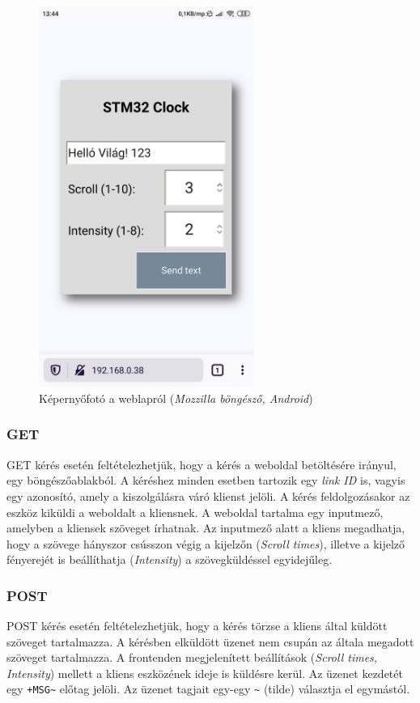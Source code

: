 \documentclass[a4paper, 12pt]{article}
\begin{document}
\begin{figure}[ht]
	\centering
	\includegraphics[width = 7cm]{images/webpage.png}
	\caption{Képernyőfotó a weblapról (\textit{Mozzilla böngésző, Android})}
	\label{fig:webpage}
\end{figure}	

\subsubsection{GET}

GET kérés esetén feltételezhetjük, hogy a kérés a weboldal betöltésére irányul, egy böngészőablakból. A kéréshez minden esetben tartozik egy \textit{link ID} is, vagyis egy azonosító, amely a kiszolgálásra váró klienst jelöli. A kérés feldolgozásakor az eszköz kiküldi a weboldalt a kliensnek. A weboldal tartalma egy inputmező, amelyben a kliensek szöveget írhatnak. Az inputmező alatt a kliens megadhatja, hogy a szövege hányszor csússzon végig a kijelzőn (\textit{Scroll times}), illetve a kijelző fényerejét is beállíthatja (\textit{Intensity}) a szövegküldéssel egyidejűleg.

\subsubsection{POST}

POST kérés esetén feltételezhetjük, hogy a kérés törzse a kliens által küldött szöveget tartalmazza.
A kérésben elküldött üzenet nem csupán az általa megadott szöveget tartalmazza. A frontenden megjelenített beállítások (\textit{Scroll times, Intensity}) mellett a kliens eszközének ideje is küldésre kerül.
Az üzenet kezdetét egy \texttt{+MSG\~} előtag jelöli. Az üzenet tagjait egy-egy \texttt{\~} (tilde) választja el egymástól.
\end{document}
